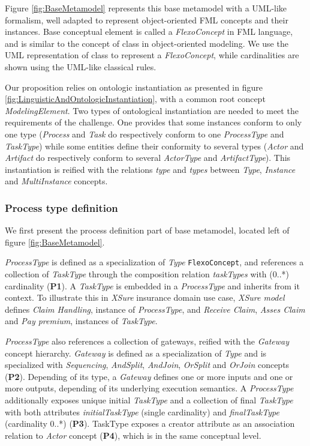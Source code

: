 Figure \ref{fig:BaseMetamodel} represents this base metamodel with a UML-like formalism, well adapted to represent object-oriented FML concepts and their instances. Base conceptual element is called a \textit{FlexoConcept} in FML language, and is similar to the concept of class in object-oriented modeling. We use the UML representation of class to represent a \textit{FlexoConcept}, while cardinalities are shown using the UML-like classical rules.

Our proposition relies on ontologic instantiation as presented in figure \ref{fig:LinguisticAndOntologicInstantiation}, with a common root concept \textit{ModelingElement}. Two types of ontological instantiation are needed to meet the requirements of the challenge. One provides that some instances conform to only one type (\textit{Process} and \textit{Task} do respectively conform to one \textit{ProcessType} and \textit{TaskType}) while some entities define their conformity to several types (\textit{Actor} and \textit{Artifact} do respectively conform to several \textit{ActorType} and \textit{ArtifactType}). This instantiation is reified with the relations \textit{type} and \textit{types} between \textit{Type}, \textit{Instance} and \textit{MultiInstance} concepts.  

\subsubsection{Process type definition}

We first present the process definition part of base metamodel, located left of figure \ref{fig:BaseMetamodel}.


\textit{ProcessType} is defined as a specialization of \textit{Type} \texttt{FlexoConcept}, and references a collection of \textit{TaskType} through the composition relation \textit{taskTypes} with (0..*) cardinality (\textbf{P1}). A \textit{TaskType} is embedded in a \textit{ProcessType} and inherits from it context. To illustrate this in \textit{XSure} insurance domain use case, \textit{XSure model} defines \textit{Claim Handling}, instance of \textit{ProcessType}, and \textit{Receive Claim}, \textit{Asses Claim} and \textit{Pay premium}, instances of \textit{TaskType}.

\textit{ProcessType} also references a collection of gateways, reified with the \textit{Gateway} concept hierarchy. \textit{Gateway} is defined as a specialization of \textit{Type} and is specialized with \textit{Sequencing}, \textit{AndSplit}, \textit{AndJoin}, \textit{OrSplit} and \textit{OrJoin} concepts (\textbf{P2}). Depending of its type, a \textit{Gateway} defines one or more inputs and one or more outputs, depending of its underlying execution semantics. A \textit{ProcessType} additionally exposes unique initial \textit{TaskType} and a collection of final \textit{TaskType} with both attributes \textit{initialTaskType} (single cardinality) and \textit{finalTaskType} (cardinality 0..*) (\textbf{P3}). TaskType exposes a creator attribute as an association relation to \textit{Actor} concept (\textbf{P4}), which is in the same conceptual level. 

